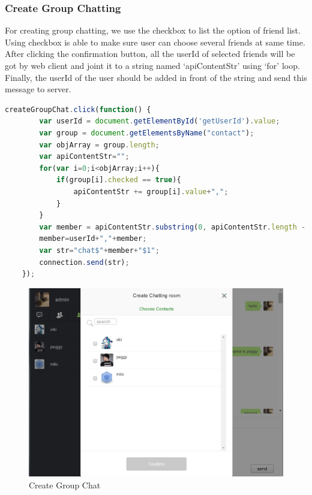 \documentclass[a4paper,11pt]{article}
\begin{document}
\subsubsection*{Create Group Chatting}
For creating group chatting, we use the checkbox to list the option of friend list. Using checkbox is able to make sure user can choose several friends at same time. After clicking the confirmation button, all the userId of selected friends will be got by web client and joint it to a string named ‘apiContentStr’ using ‘for’ loop. Finally, the userId of the user should be added in front of the string and send this message to server. 
\begin{lstlisting}[language=javascript]
 createGroupChat.click(function() {
        var userId = document.getElementById('getUserId').value;
        var group = document.getElementsByName("contact");
        var objArray = group.length;
        var apiContentStr="";
        for(var i=0;i<objArray;i++){
            if(group[i].checked == true){
                apiContentStr += group[i].value+",";
            }
        }
        var member = apiContentStr.substring(0, apiContentStr.length - 1);
        member=userId+","+member;
        var str="chat$"+member+"$1";
        connection.send(str);
    });
\end{lstlisting}
\begin{figure}[!h]
\centering
\includegraphics[width = 0.9 \textwidth ]{creategroupchat.png}
\caption{\label{fig:UML}Create Group Chat}
\end{figure}
\end{document}
